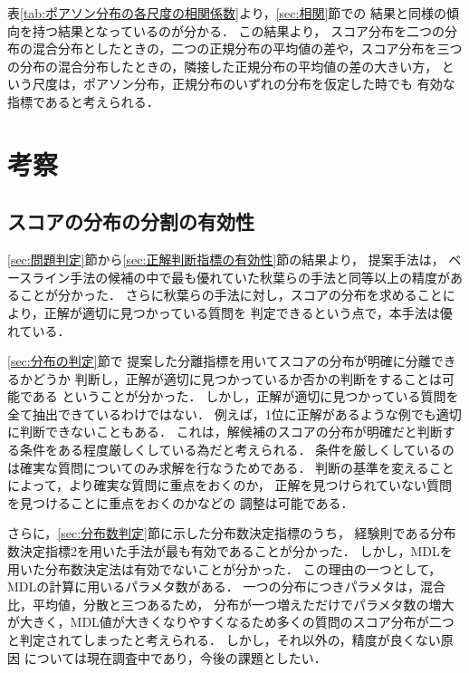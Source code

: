 \documentclass[japanese]{jnlp_1.4}
\begin{document}
表\ref{tab:ポアソン分布の各尺度の相関係数}より，\ref{sec:相関}節での
結果と同様の傾向を持つ結果となっているのが分かる．
この結果より，
スコア分布を二つの分布の混合分布としたときの，二つの正規分布の平均値の差や，スコア分布を三つの分布の混合分布したときの，隣接した正規分布の平均値の差の大きい方，
という尺度は，ポアソン分布，正規分布のいずれの分布を仮定した時でも
有効な指標であると考えられる．



\section{考察}\label{Chapter:discussion}
 

\subsection{スコアの分布の分割の有効性}


\ref{sec:問題判定}節から\ref{sec:正解判断指標の有効性}節の結果より，
提案手法は，
ベースライン手法の候補の中で最も優れていた秋葉らの手法\cite{秋葉:質問応答における常識的な解の選択と期待効用に基づく回答群の決定}と同等以上の精度があることが分かった．
さらに秋葉らの手法に対し，スコアの分布を求めることにより，正解が適切に見つかっている質問を
判定できるという点で，本手法は優れている．

\ref{sec:分布の判定}節で
提案した分離指標を用いてスコアの分布が明確に分離できるかどうか
判断し，正解が適切に見つかっているか否かの判断をすることは可能である
ということが分かった．
しかし，正解が適切に見つかっている質問を全て抽出できているわけではない．
例えば，1位に正解があるような例でも適切に判断できないこともある．
これは，解候補のスコアの分布が明確だと判断する条件をある程度厳しくしている為だと考えられる．
条件を厳しくしているのは確実な質問についてのみ求解を行なうためである．
判断の基準を変えることによって，より確実な質問に重点をおくのか，
正解を見つけられていない質問を見つけることに重点をおくのかなどの
調整は可能である．

さらに，\ref{sec:分布数判定}節に示した分布数決定指標のうち，
経験則である分布数決定指標2を用いた手法が最も有効であることが分かった．
しかし，MDLを用いた分布数決定法は有効でないことが分かった．
この理由の一つとして，MDLの計算に用いるパラメタ数がある．
一つの分布につきパラメタは，混合比，平均値，分散と三つあるため，
分布が一つ増えただけでパラメタ数の増大が大きく，MDL値が大きくなりやすくなるため多くの質問のスコア分布が二つと判定されてしまったと考えられる．
しかし，それ以外の，精度が良くない原因
については現在調査中であり，今後の課題としたい．
\end{document}
